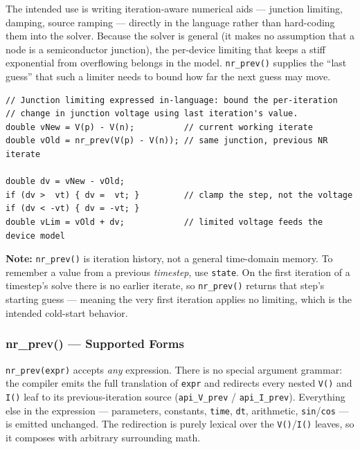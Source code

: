 \documentclass[11pt, a4paper]{article}
\newcommand{\code}[1]{\texttt{\small #1}}
\begin{document}
The intended use is writing iteration-aware numerical aids --- junction limiting,
damping, source ramping --- directly in the language rather than hard-coding them
into the solver. Because the solver is general (it makes no assumption that a node
is a semiconductor junction), the per-device limiting that keeps a stiff
exponential from overflowing belongs in the model. \code{nr\_prev()} supplies the
``last guess'' that such a limiter needs to bound how far the next guess may move.

\begin{lstlisting}
// Junction limiting expressed in-language: bound the per-iteration
// change in junction voltage using last iteration's value.
double vNew = V(p) - V(n);          // current working iterate
double vOld = nr_prev(V(p) - V(n)); // same junction, previous NR iterate

double dv = vNew - vOld;
if (dv >  vt) { dv =  vt; }         // clamp the step, not the voltage
if (dv < -vt) { dv = -vt; }
double vLim = vOld + dv;            // limited voltage feeds the device model
\end{lstlisting}

\textbf{Note:} \code{nr\_prev()} is iteration history, not a general
time-domain memory. To remember a value from a previous
\textit{timestep}, use \code{state}. On the first iteration of a timestep's solve
there is no earlier iterate, so \code{nr\_prev()} returns that step's starting
guess --- meaning the very first iteration applies no limiting, which is the
intended cold-start behavior.

\subsubsection{nr\_prev() --- Supported Forms}
\code{nr\_prev(expr)} accepts \textit{any} expression. There is no special
argument grammar: the compiler emits the full translation of \code{expr} and
redirects every nested \code{V()} and \code{I()} leaf to its previous-iteration
source (\code{api\_V\_prev} / \code{api\_I\_prev}). Everything else in the
expression --- parameters, constants, \code{time}, \code{dt}, arithmetic,
\code{sin}/\code{cos} --- is emitted unchanged. The redirection is purely
lexical over the \code{V()}/\code{I()} leaves, so it composes with arbitrary
surrounding math.
\end{document}
